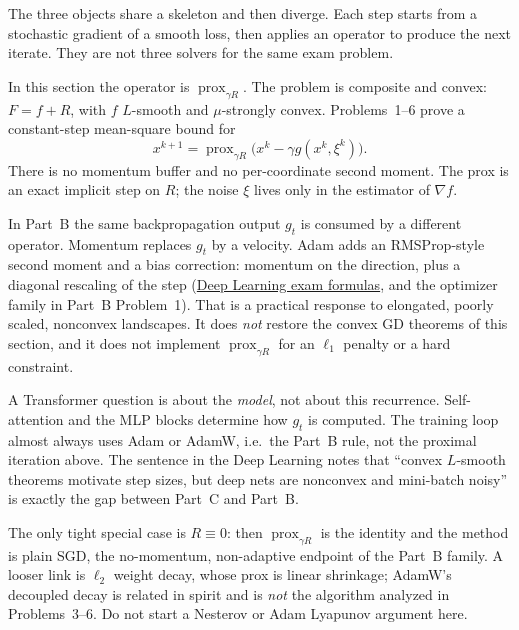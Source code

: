\documentclass[11pt,a4paper]{article}
\DeclareMathOperator{\prox}{prox}
\newcommand{\jump}[2]{\hyperref[#1]{#2}}
\theoremstyle{definition}
\begin{document}
\begin{remark}\label{rem:prox-vs-adam}
The three objects share a skeleton and then diverge. Each step starts from a
stochastic gradient of a smooth loss, then applies an operator to produce the
next iterate. They are not three solvers for the same exam problem.

In this section the operator is \(\prox_{\gamma R}\). The problem is composite
and convex: \(F=f+R\), with \(f\) \(L\)-smooth and \(\mu\)-strongly convex.
Problems~1--6 prove a constant-step mean-square bound for
\[
x^{k+1}=\prox_{\gamma R}\bigl(x^k-\gamma g(x^k,\xi^k)\bigr).
\]
There is no momentum buffer and no per-coordinate second moment. The prox is
an exact implicit step on \(R\); the noise \(\xi\) lives only in the estimator
of \(\nabla f\).

In Part~B the same backpropagation output \(g_t\) is consumed by a different
operator. Momentum replaces \(g_t\) by a velocity. Adam adds an RMSProp-style
second moment and a bias correction:
momentum on the direction, plus a diagonal rescaling of the step
(\jump{prop:dlu-mom}{Deep Learning exam formulas}, and the optimizer family in
Part~B Problem~1). That is a practical response to elongated, poorly scaled,
nonconvex landscapes. It does \emph{not} restore the convex GD theorems of
this section, and it does not implement \(\prox_{\gamma R}\) for an
\(\ell_1\) penalty or a hard constraint.

A Transformer question is about the \emph{model}, not about this recurrence.
Self-attention and the MLP blocks determine how \(g_t\) is computed. The
training loop almost always uses Adam or AdamW, i.e.\ the Part~B rule, not the
proximal iteration above. The sentence in the Deep Learning notes that
``convex \(L\)-smooth theorems motivate step sizes, but deep nets are
nonconvex and mini-batch noisy'' is exactly the gap between Part~C and
Part~B.

The only tight special case is \(R\equiv 0\): then \(\prox_{\gamma R}\) is the
identity and the method is plain SGD, the no-momentum, non-adaptive endpoint
of the Part~B family. A looser link is \(\ell_2\) weight decay, whose prox is
linear shrinkage; AdamW's decoupled decay is related in spirit and is
\emph{not} the algorithm analyzed in Problems~3--6. Do not start a Nesterov or
Adam Lyapunov argument here.


\end{remark}
\end{document}
